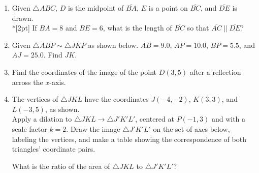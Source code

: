 \documentclass[12pt, twoside]{article}
\begin{document}
\begin{enumerate}
\item Given $\triangle ABC$, $D$ is the midpoint of $\overline{BA}$, $E$ is a point on $\overline{BC}$, and $\overline{DE}$ is drawn. \\*[2pt] 
If $BA=8$ and $BE=6$, what is the length of $\overline{BC}$ so that $\overline{AC} \parallel \overline{DE}$?
\begin{flushright}
  \end{flushright}

\item Given $\triangle ABP \sim \triangle JKP$ as shown below. $AB=9.0$, $AP=10.0$, $BP=5.5$, and $AJ=25.0$. Find $JK$.
\begin{flushright}
  \end{flushright}
  \vspace{0.5cm}

\newpage

\item Find the coordinates of the image of the point $D(3,5)$ after a reflection across the $x$-axis. \vspace{3cm}

\item The vertices of $\triangle JKL$ have the coordinates $J(-4,-2)$, $K(3,3)$, and $L(-3,5)$, as shown. \\[0.25cm]
Apply a dilation to $\triangle JKL \rightarrow \triangle J'K'L'$, centered at $P(-1,3)$ and with a scale factor $k=2$. Draw the image $\triangle J'K'L'$ on the set of axes below, labeling the vertices, and make a table showing the correspondence of both triangles' coordinate pairs.
  \begin{flushright}
  \end{flushright}
  What is the ratio of the area of $\triangle JKL$ to $\triangle J'K'L'$?


\end{enumerate}
\end{document}
